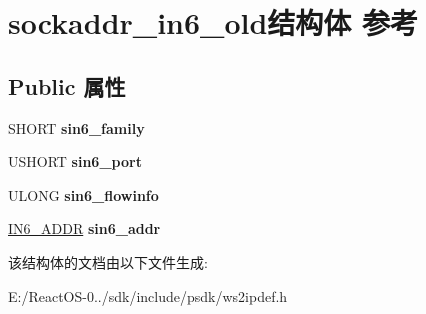 \hypertarget{structsockaddr__in6__old}{}\section{sockaddr\+\_\+in6\+\_\+old结构体 参考}
\label{structsockaddr__in6__old}
\subsection*{Public 属性}
\begin{DoxyCompactItemize}
\item 
\mbox{\label{structsockaddr__in6__old_adcd3637cfea812cdb7cff60f7378b0d7}} 
S\+H\+O\+RT {\bfseries sin6\+\_\+family}
\item 
\mbox{\label{structsockaddr__in6__old_a4125b5717cfa86f25bc71f0b9f8006a1}} 
U\+S\+H\+O\+RT {\bfseries sin6\+\_\+port}
\item 
\mbox{\label{structsockaddr__in6__old_af82cdbf4f4d3054c49e5d0e40bbaab77}} 
U\+L\+O\+NG {\bfseries sin6\+\_\+flowinfo}
\item 
\mbox{\label{structsockaddr__in6__old_a52031a19de2b9013710d8053a5a50548}} 
\hyperlink{structin6__addr}{I\+N6\+\_\+\+A\+D\+DR} {\bfseries sin6\+\_\+addr}
\end{DoxyCompactItemize}


该结构体的文档由以下文件生成\+:\begin{DoxyCompactItemize}
\item 
E\+:/\+React\+O\+S-\/0../sdk/include/psdk/ws2ipdef.\+h\end{DoxyCompactItemize}
